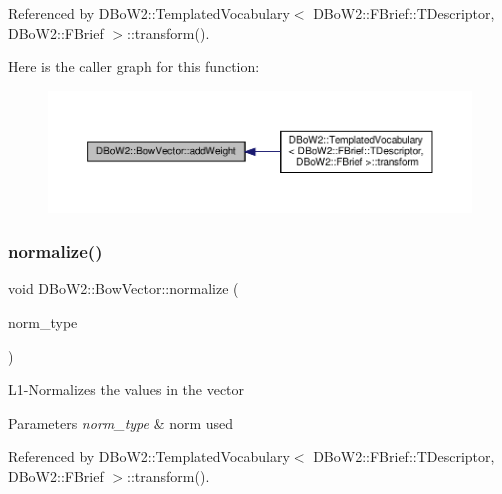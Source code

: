 Referenced by D\+Bo\+W2\+::\+Templated\+Vocabulary$<$ D\+Bo\+W2\+::\+F\+Brief\+::\+T\+Descriptor, D\+Bo\+W2\+::\+F\+Brief $>$\+::transform().

Here is the caller graph for this function\+:\nopagebreak
\begin{figure}[H]
\begin{center}
\leavevmode
\includegraphics[width=350pt]{classDBoW2_1_1BowVector_a3ac92a805b252c93dc6535240d02df47_icgraph}
\end{center}
\end{figure}
\mbox{\label{classDBoW2_1_1BowVector_acd2dd34023e3053a4cc75d70c8b6ac13}} 
\subsubsection{\texorpdfstring{normalize()}{normalize()}}
{\footnotesize\ttfamily void D\+Bo\+W2\+::\+Bow\+Vector\+::normalize (\begin{DoxyParamCaption}\item[{\hyperlink{namespaceDBoW2_a53e9e0bcfc25c861815e413a7cf3fa51}{L\+Norm}}]{norm\+\_\+type }\end{DoxyParamCaption})}

L1-\/\+Normalizes the values in the vector 
\begin{DoxyParams}{Parameters}
{\em norm\+\_\+type} & norm used \\
\hline
\end{DoxyParams}


Referenced by D\+Bo\+W2\+::\+Templated\+Vocabulary$<$ D\+Bo\+W2\+::\+F\+Brief\+::\+T\+Descriptor, D\+Bo\+W2\+::\+F\+Brief $>$\+::transform().

